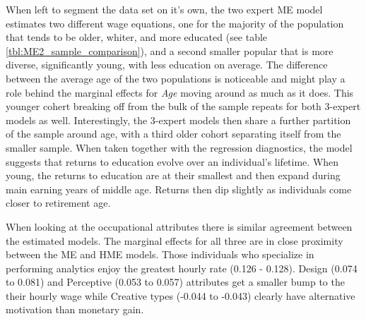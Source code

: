 \documentclass[12pt]{article}
\begin{document}
When left to segment the data set on it's own, the two expert ME model estimates two different
wage equations, one for the majority of the population that tends to be
older, whiter, and more educated (see table \ref{tbl:ME2_sample_comparison}), and a second
smaller popular that is more diverse, significantly young, with less education on average.
The difference between the average age of the two populations is noticeable and
might play a role behind the marginal effects for \textit{Age} moving around as
much as it does. This younger cohert breaking off from the bulk of the sample
repeats for both 3-expert models as well. Interestingly, the 3-expert models then share a
further partition of the sample around age, with a third older cohort separating itself
from the smaller sample. When taken together with the regression diagnostics, the model
suggests that returns to education evolve over an individual's lifetime. When young,
the returns to education are at their smallest and then expand during main earning years
of middle age. Returns then dip slightly as individuals come closer to retirement age.

When looking at the occupational attributes there is similar agreement between
the estimated models. The marginal effects for all three are in close proximity between
the ME and HME models. Those individuals who specialize in performing analytics
enjoy the greatest hourly rate (0.126 - 0.128). Design (0.074 to 0.081) and 
Perceptive (0.053 to 0.057) attributes get a smaller bump to the their hourly
wage while Creative types (-0.044 to -0.043) clearly have alternative motivation than
monetary gain.
\end{document}
